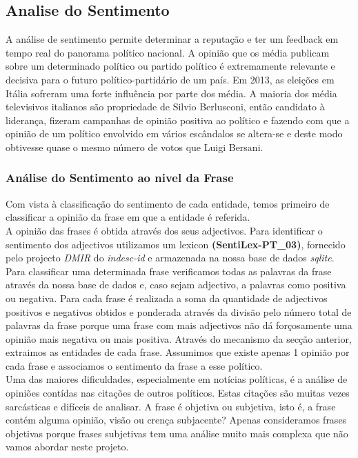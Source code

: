 \subsection{Analise do Sentimento}
\label{sec:sentiment_analysis}
\hspace{15pt}A análise de sentimento permite determinar a reputação e ter um feedback em tempo real do panorama político nacional. A opinião que os média publicam sobre um determinado político ou partido político é extremamente relevante e decisiva para o futuro político-partidário de um país. Em 2013, as eleições em Itália sofreram uma forte influência por parte dos média. A maioria dos média televisivos italianos são propriedade de Silvio Berlusconi, então candidato à liderança, fizeram campanhas de opinião positiva ao político e fazendo com que a opinião de um político envolvido em vários escândalos se altera-se e deste modo obtivesse quase o mesmo número de votos que Luigi Bersani.\newline\hspace{15pt}

\subsubsection{Análise do Sentimento ao nivel da Frase}
\hspace{15pt} Com vista à classificação do sentimento de cada entidade, temos primeiro de classificar a opinião da frase em que a entidade  é 
referida.\\
 A opinião das frases é obtida através dos seus adjectivos. Para identificar o sentimento dos adjectivos utilizamos um lexicon \textbf{(SentiLex-PT\_03)}, fornecido pelo projecto \textit{DMIR} do \textit{indesc-id} e armazenada na nossa base de dados \textit{sqlite}. Para classificar uma determinada frase verificamos todas as palavras da frase através da nossa base de dados  e, caso sejam adjectivo, a palavras como positiva ou negativa. Para cada frase é realizada a soma da quantidade de adjectivos positivos e negativos obtidos 
 e ponderada através da divisão pelo número total de palavras da frase porque 
 uma frase com mais adjectivos não dá forçosamente uma opinião mais negativa ou 
 mais positiva.  Através do mecanismo da secção anterior, extraimos as entidades de cada frase. Assumimos que existe apenas 1 opinião por cada frase 
 e associamos o sentimento da frase a esse político. \\
Uma das maiores dificuldades, especialmente em notícias políticas, é a análise de opiniões contídas nas citações de outros políticos. Estas citações são muitas vezes sarcásticas e difíceis de analisar. A frase é objetiva ou subjetiva, isto é, a frase contém alguma opinião, visão ou crença subjacente? Apenas consideramos frases objetivas porque frases subjetivas tem uma análise muito mais complexa que não vamos abordar neste projeto. 

